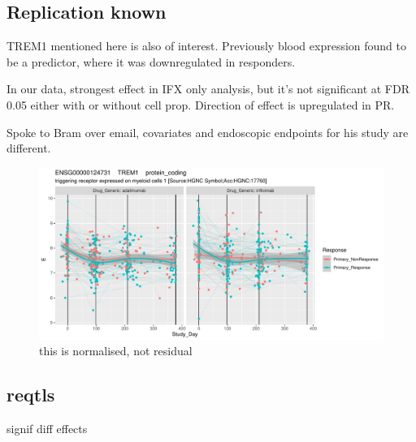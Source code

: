 \begin{outline}
\subsection{Replication known}



TREM1 mentioned here is also of interest.
Previously blood expression found to be a predictor, where it was downregulated in responders.

In our data, strongest effect in IFX only analysis, but it’s not significant at FDR 0.05 either with or without cell prop.
Direction of effect is upregulated in PR.

Spoke to Bram over email, covariates and endoscopic endpoints for his study are different.

\begin{figure}
    \centering
    \includegraphics[width=1.0\textwidth,page=1]{mainmatter/figures/chapter_04/dream.E_vs_Study_Day.GENEID_ENSG00000124731.SYMBOL_TREM1.pdf}
    \caption{this is normalised, not residual}
    \label{fig:multipants_dge_TREM1}
\end{figure}

\subsection{reqtls}



signif diff effects


\end{outline}

